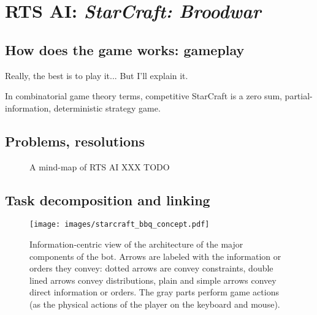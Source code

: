 \chapter{RTS AI: \textit{StarCraft: Broodwar}}

\section{How does the game works: gameplay}
Really, the best is to play it... But I'll explain it.

In combinatorial game theory terms, competitive StarCraft is a zero sum, partial-information, deterministic strategy game.

\section{Problems, resolutions}

\begin{figure}[!ht]
\begin{center}
\end{center}
\label{fig:mindmapRTS}
\caption{A mind-map of RTS AI XXX TODO}
\end{figure}

\section{Task decomposition and linking}
\begin{figure}[!ht]
\begin{center}
\texttt{[image: images/starcraft\_bbq\_concept.pdf]}
\end{center}
\label{fig:conceptbbq}
\caption{Information-centric view of the architecture of the major components of the bot. Arrows are labeled with the information or orders they convey: dotted arrows are convey constraints, double lined arrows convey distributions, plain and simple arrows convey direct information or orders. The gray parts perform game actions (as the physical actions of the player on the keyboard and mouse).}
\end{figure}

